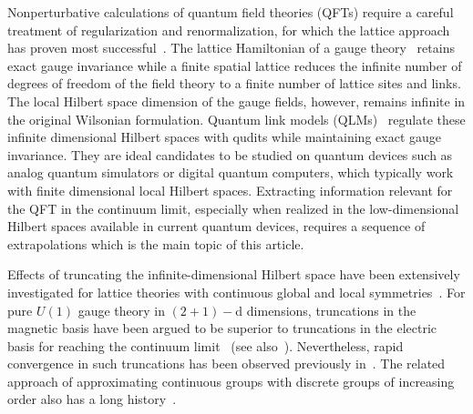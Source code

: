 \documentclass[aps,prl,reprint,twocolumn,superscriptaddress,floatfix,nofootinbib]{revtex4-1}
\begin{document}
	Nonperturbative calculations of quantum field theories (QFTs) require a careful treatment of regularization and renormalization, for which the lattice approach has proven most successful~\cite{montvay1997quantum}. The lattice Hamiltonian of a gauge theory~\cite{kogut1975hamiltonian} retains exact gauge invariance while a finite spatial lattice reduces the infinite number of degrees of freedom of the field theory to a finite number of lattice sites and links. The local Hilbert space dimension of the gauge fields, however, remains infinite in the original Wilsonian formulation. Quantum link models (QLMs)~\cite{Horn:1981kk, Orland:1989st, chandrasekharan1997quantum} regulate these infinite dimensional Hilbert spaces with qudits while maintaining exact gauge invariance. They are ideal candidates to be studied on quantum devices such as analog quantum simulators or digital quantum computers, which typically work with finite dimensional local Hilbert spaces. Extracting information relevant for the QFT in the continuum limit, especially when realized in the low-dimensional Hilbert spaces available in current quantum devices, requires a sequence of extrapolations which is the main topic of this article.
	
	Effects of truncating the infinite-dimensional Hilbert space have been extensively investigated for lattice theories with continuous global and local symmetries~\cite{Byrnes:2002nv, Byrnes:2005qx, Yang2016, Buyens_2017, Niedermayer:2016hzw, Raychowdhury:2018osk, davoudi2021toward, Yockey2018, Zhang2021, Gustafson2021}. For pure $U(1)$ gauge theory in $(2+1)-$d dimensions, truncations in the magnetic basis have been argued to be superior to truncations in the electric basis for reaching the continuum limit~\cite{Paulson:2020zjd} (see also~\cite{Kaplan:2018vnj,Yockey2019,bender2020gauge}). Nevertheless, rapid convergence in such truncations has been observed previously in~\cite{kuhn2014quantum,buyens2017finite}. The related approach of approximating continuous groups with discrete groups of increasing order also has a long history~\cite{Bhanot:1981xp, Hasenfratz:2000sa, Ercolessi:2017jbi, Alexandru:2019nsa, Kurkcuoglu2021, Alam2021, Bender2018, Hackett2019}.
	
\end{document}
